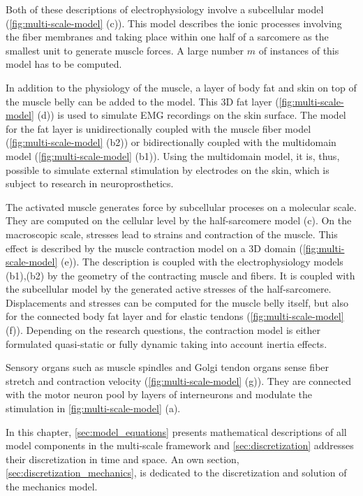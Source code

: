 Both of these descriptions of electrophysiology involve a subcellular model (\cref{fig:multi-scale-model} (c)). This model describes the ionic processes involving the fiber membranes and taking place within one half of a sarcomere as the smallest unit to generate muscle forces. A large number $m$ of instances of this model has to be computed. 

In addition to the physiology of the muscle, a layer of body fat and skin on top of the muscle belly can be added to the model. This 3D fat layer (\cref{fig:multi-scale-model} (d)) is used to simulate EMG recordings on the skin surface. The model for the fat layer is unidirectionally coupled with the muscle fiber model (\cref{fig:multi-scale-model} (b2)) or bidirectionally coupled with the multidomain model (\cref{fig:multi-scale-model} (b1)). Using the multidomain model, it is, thus, possible to simulate external stimulation by electrodes on the skin, which is subject to research in neuroprosthetics.

The activated muscle generates force by subcellular proceses on a molecular scale. They are computed on the cellular level by the half-sarcomere model (c). On the macroscopic scale, stresses lead to strains and contraction of the muscle. This effect is described by the muscle contraction model on a 3D domain (\cref{fig:multi-scale-model} (e)). 
The description is coupled with the electrophysiology models (b1),(b2) by the geometry of the contracting muscle and fibers. It is coupled with the subcellular model by the generated active stresses of the half-sarcomere. Displacements and stresses can be computed for the muscle belly itself, but also for the connected body fat layer and for elastic tendons (\cref{fig:multi-scale-model} (f)). Depending on the research questions, the contraction model is either formulated quasi-static or fully dynamic taking into account inertia effects.

Sensory organs such as muscle spindles and Golgi tendon organs sense fiber stretch and contraction velocity (\cref{fig:multi-scale-model} (g)). They are connected with the motor neuron pool by layers of interneurons and modulate the stimulation in \cref{fig:multi-scale-model} (a).

In this chapter, \cref{sec:model_equations} presents mathematical descriptions of all model components in the multi-scale framework and \cref{sec:discretization} addresses their discretization in time and space. An own section, \cref{sec:discretization_mechanics}, is dedicated to the discretization and solution of the mechanics model.

